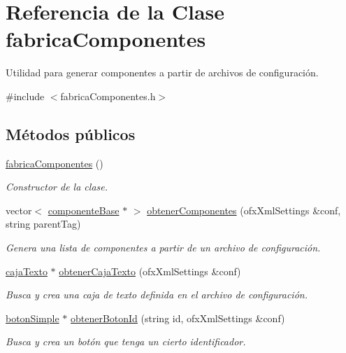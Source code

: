 \hypertarget{classfabrica_componentes}{}\section{Referencia de la Clase fabrica\+Componentes}
\label{classfabrica_componentes}


Utilidad para generar componentes a partir de archivos de configuración.  




{\ttfamily \#include $<$fabrica\+Componentes.\+h$>$}

\subsection*{Métodos públicos}
\begin{DoxyCompactItemize}
\item 
\hyperlink{classfabrica_componentes_a460be5076a70e15652163591eb5820bf}{fabrica\+Componentes} ()
\begin{DoxyCompactList}\small\item\em Constructor de la clase. \end{DoxyCompactList}\item 
vector$<$ \hyperlink{classcomponente_base}{componente\+Base} $\ast$ $>$ \hyperlink{classfabrica_componentes_a05e1fdd9e97037c6e94778479ea4c062}{obtener\+Componentes} (ofx\+Xml\+Settings \&conf, string parent\+Tag)
\begin{DoxyCompactList}\small\item\em Genera una lista de componentes a partir de un archivo de configuración. \end{DoxyCompactList}\item 
\hyperlink{classcaja_texto}{caja\+Texto} $\ast$ \hyperlink{classfabrica_componentes_a995031bf966e21773d7dc1777dae811c}{obtener\+Caja\+Texto} (ofx\+Xml\+Settings \&conf)
\begin{DoxyCompactList}\small\item\em Busca y crea una caja de texto definida en el archivo de configuración. \end{DoxyCompactList}\item 
\hyperlink{classboton_simple}{boton\+Simple} $\ast$ \hyperlink{classfabrica_componentes_a238aef4aa7fb7ca425efdfb22520171d}{obtener\+Boton\+Id} (string id, ofx\+Xml\+Settings \&conf)
\begin{DoxyCompactList}\small\item\em Busca y crea un botón que tenga un cierto identificador. \end{DoxyCompactList}\end{DoxyCompactItemize}


